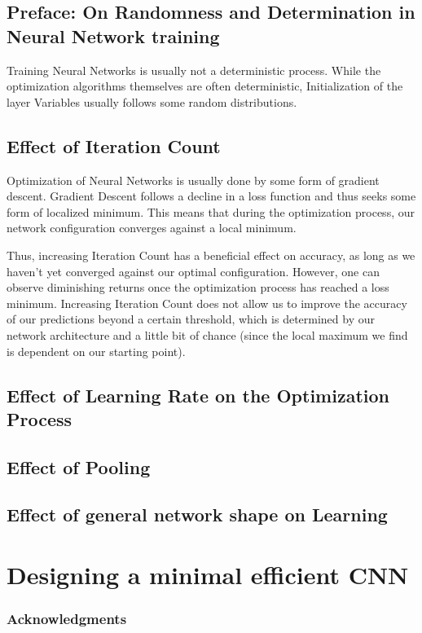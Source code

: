 \documentclass{article}
\begin{document}
\subsection{Preface: On Randomness and Determination in Neural Network training}
Training Neural Networks is usually not a deterministic process. While the optimization algorithms themselves are often deterministic, Initialization of the layer Variables usually follows some random distributions.


\subsection{Effect of Iteration Count}
Optimization of Neural Networks is usually done by some form of gradient descent. Gradient Descent follows a decline in a loss function and thus seeks some form of localized minimum. This means that during the optimization process, our network configuration converges against a local minimum.

Thus, increasing Iteration Count has a beneficial effect on accuracy, as long as we haven't yet converged against our optimal configuration. However, one can observe diminishing returns once the optimization process has reached a loss minimum. Increasing Iteration Count does not allow us to improve the accuracy of our predictions beyond a certain threshold, which is determined by our network architecture and a little bit of chance (since the local maximum we find is dependent on our starting point).
\subsection{Effect of Learning Rate on the Optimization Process}
\subsection{Effect of Pooling}
\subsection{Effect of general network shape on Learning}

\section{Designing a minimal efficient CNN}



\subsubsection*{Acknowledgments}
\end{document}
